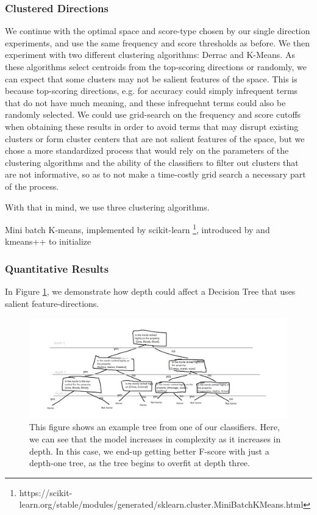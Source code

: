 \subsubsection{Clustered Directions}
We continue with the optimal space and score-type chosen by our single direction experiments, and use the same frequency and score thresholds as before. We then experiment with two different clustering algorithms: Derrac and K-Means. As these algorithms select centroids from the top-scoring directions or randomly, we can expect that some clusters may not be salient features of the space. This is because top-scoring directions, e.g. for accuracy could simply infrequent terms that do not have much meaning, and these infrequehnt terms could also be randomly selected. We could use grid-search on the frequency and score cutoffs when obtaining these results in order to avoid terms that may disrupt existing clusters or form cluster centers that are not salient features of the space, but we chose a more standardized process that would rely on the parameters of the clustering algorithms and the ability of the classifiers to filter out clusters that are not informative, so as to not make a time-costly grid search a necessary part of the process.

With that in mind, we use three clustering algorithms.

Mini batch K-means, implemented by scikit-learn \footnote{https://scikit-learn.org/stable/modules/generated/sklearn.cluster.MiniBatchKMeans.html}, introduced by \cite{Sculley2010} and kmeans++ to initialize \cite{Arthur}

\subsubsection{Quantitative Results}
In Figure \ref{IntroDecisionTree}, we demonstrate how depth could affect a Decision Tree that uses salient feature-directions. 

\begin{figure}[t]
	\includegraphics[width=\textwidth]{images/decisiontree.png}
	\centering
	\caption{This figure shows an example tree from one of our classifiers. Here, we can see that the model increases in complexity as it increases in depth. In this case, we end-up getting better F-score with just a depth-one tree, as the tree begins to overfit at depth three.  }\label{IntroDecisionTree}
\end{figure}

